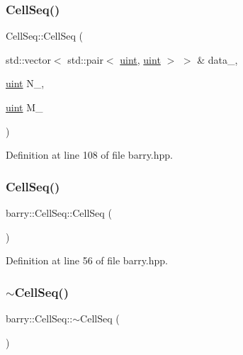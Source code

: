 \subsubsection{\texorpdfstring{Cell\+Seq()}{CellSeq()}\hspace{0.1cm}{\footnotesize\ttfamily [1/2]}}
{\footnotesize\ttfamily Cell\+Seq\+::\+Cell\+Seq (\begin{DoxyParamCaption}\item[{std\+::vector$<$ std\+::pair$<$ \hyperlink{namespacebarry_a11dfc53ddb4672278319aa04f1e09a6c}{uint}, \hyperlink{namespacebarry_a11dfc53ddb4672278319aa04f1e09a6c}{uint} $>$ $>$ \&}]{data\+\_\+,  }\item[{\hyperlink{namespacebarry_a11dfc53ddb4672278319aa04f1e09a6c}{uint}}]{N\+\_\+,  }\item[{\hyperlink{namespacebarry_a11dfc53ddb4672278319aa04f1e09a6c}{uint}}]{M\+\_\+ }\end{DoxyParamCaption})\hspace{0.3cm}{\ttfamily [inline]}}



Definition at line 108 of file barry.\+hpp.

\mbox{\label{classbarry_1_1_cell_seq_adaef92a0551e50ac803c2f8f2d54d6a9}} 
\subsubsection{\texorpdfstring{Cell\+Seq()}{CellSeq()}\hspace{0.1cm}{\footnotesize\ttfamily [2/2]}}
{\footnotesize\ttfamily barry\+::\+Cell\+Seq\+::\+Cell\+Seq (\begin{DoxyParamCaption}{ }\end{DoxyParamCaption})\hspace{0.3cm}{\ttfamily [inline]}}



Definition at line 56 of file barry.\+hpp.

\mbox{\label{classbarry_1_1_cell_seq_a3af19bd8e8ea575565bc0fa9fe66158d}} 
\subsubsection{\texorpdfstring{$\sim$\+Cell\+Seq()}{~CellSeq()}}
{\footnotesize\ttfamily barry\+::\+Cell\+Seq\+::$\sim$\+Cell\+Seq (\begin{DoxyParamCaption}{ }\end{DoxyParamCaption})\hspace{0.3cm}{\ttfamily [inline]}}



